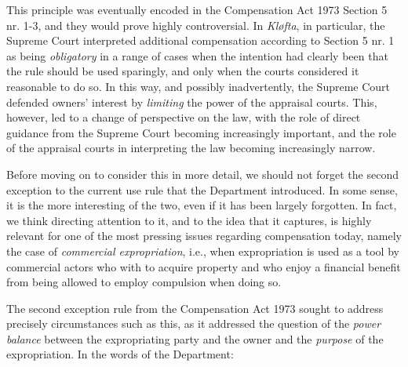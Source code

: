 This principle was eventually encoded in the Compensation Act 1973 Section 5 nr. 1-3, and they would prove highly controversial. In \emph{Kløfta}, in particular, the Supreme Court interpreted additional compensation according to Section 5 nr. 1 as being \emph{obligatory} in a range of cases when the intention had clearly been that the rule should be used sparingly, and only when the courts considered it reasonable to do so. In this way, and possibly inadvertently, the Supreme Court defended owners' interest by \emph{limiting} the power of the appraisal courts. This, however, led to a change of perspective on the law, with the role of direct guidance from the Supreme Court becoming increasingly important, and the role of the appraisal courts in interpreting the law becoming increasingly narrow.

Before moving on to consider this in more detail, we should not forget the second exception to the current use rule that the Department introduced. In some sense, it is the more interesting of the two, even if it has been largely forgotten. In fact, we think directing attention to it, and to the idea that it captures, is highly relevant for one of the most pressing issues regarding compensation today, namely the case of \emph{commercial expropriation}, i.e., when expropriation is used as a tool by commercial actors who with to acquire property and who enjoy a financial benefit from being allowed to employ compulsion when doing so. 

The second exception rule from the Compensation Act 1973 sought to address precisely circumstances such as this, as it addressed the question of the \emph{power balance} between the expropriating party and the owner and the \emph{purpose} of the expropriation. In the words of the Department:

